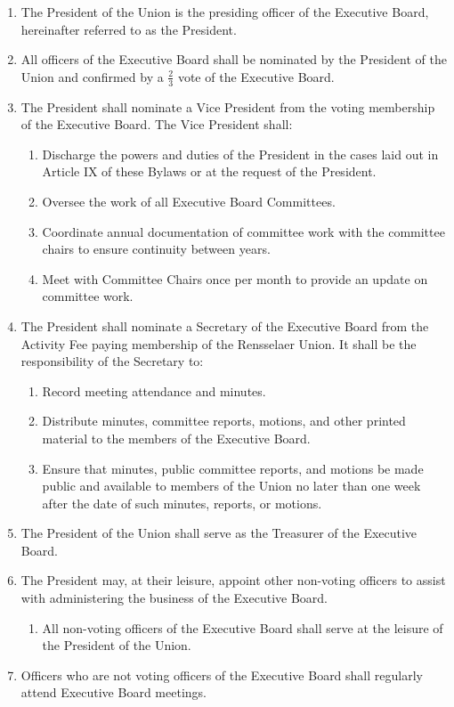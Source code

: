 
\begin{enumerate}

    \item The President of the Union is the presiding officer of the Executive Board, hereinafter referred to as the President.

    \item All officers of the Executive Board shall be nominated by the President of the Union and
    confirmed by a $\frac{2}{3}$ vote of the Executive Board.

    \item The President shall nominate a Vice President from the voting membership of the Executive Board. The Vice President shall:
    \begin{enumerate}
        \item Discharge the powers and duties of the President in the cases laid out in Article IX of these Bylaws or at the request of the President.
        \item Oversee the work of all Executive Board Committees.
        \item Coordinate annual documentation of committee work with the committee chairs to ensure continuity between years.
        \item Meet with Committee Chairs once per month to provide an update on committee work.
    \end{enumerate}

    \item The President shall nominate a Secretary of the Executive Board from the Activity Fee paying membership of the Rensselaer Union. It shall be the responsibility of the Secretary to:
    \begin{enumerate}
        \item Record meeting attendance and minutes.
        \item Distribute minutes, committee reports, motions, and other printed material to the members of the Executive Board.
        \item Ensure that minutes, public committee reports, and motions be made public and available to members of the Union no later than one week after the date of such minutes, reports, or motions.
    \end{enumerate}

    \item  The President of the Union shall serve as the Treasurer of the Executive Board.

    \item The President may, at their leisure, appoint other non-voting officers to assist with administering the business of the Executive Board.
    \begin{enumerate}
        \item All non-voting officers of the Executive Board shall serve at the leisure of the President of the Union.
    \end{enumerate}


    \item Officers who are not voting officers of the Executive Board shall regularly attend Executive Board meetings.

\end{enumerate}
